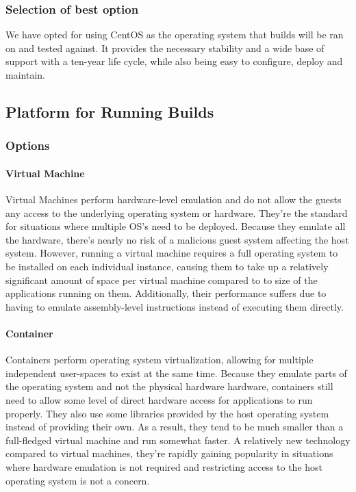 \documentclass[10pt,letterpaper,onecolumn,draftclsnofoot]{IEEEtran}
\begin{document}
\subsubsection{Selection of best option}
We have opted for using CentOS as the operating system that builds will be ran on and tested against. It provides the necessary stability and a wide base of support with a ten-year life cycle, while also being easy to configure, deploy and maintain.
\subsection{Platform for Running Builds}
\subsubsection{Options}
\paragraph{Virtual Machine}
Virtual Machines perform hardware-level emulation and do not allow the guests any access to the underlying operating system or hardware. They're the standard for situations where multiple OS's need to be deployed. Because they emulate all the hardware, there's nearly no risk of a malicious guest system affecting the host system. However, running a virtual machine requires a full operating system to be installed on each individual instance, causing them to take up a relatively significant amount of space per virtual machine compared to to size of the applications running on them. Additionally, their performance suffers due to having to emulate assembly-level instructions instead of executing them directly.
\paragraph{Container}
Containers perform operating system virtualization, allowing for multiple independent user-spaces to exist at the same time. Because they emulate parts of the operating system and not the physical hardware hardware, containers still need to allow some level of direct hardware access for applications to run properly. They also use some libraries provided by the host operating system instead of providing their own. As a result, they tend to be much smaller than a full-fledged virtual machine and run somewhat faster. A relatively new technology compared to virtual machines, they're rapidly gaining popularity in situations where hardware emulation is not required and restricting access to the host operating system is not a concern.
\end{document}
